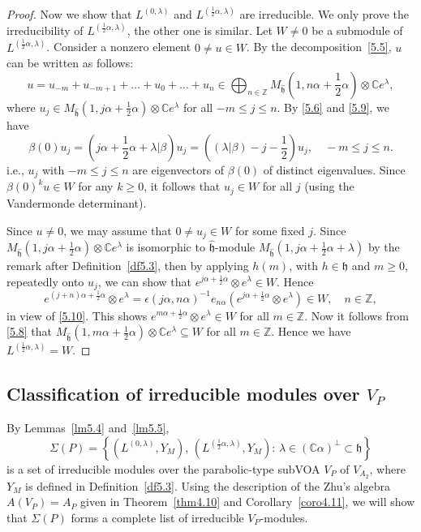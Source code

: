 \documentclass[12pt,a4paper,reqno]{amsart}
\numberwithin{equation}{section}
\numberwithin{equation}{section}
\theoremstyle{definition}
\newcommand{\Z}{\mathbb{Z}}
\def \C {\mathbb{C}}
\def\la{\lambda}
\def \al{\alpha}
\def \b {\beta}
\def \ssq{\subseteq}
\def \h {\mathfrak{h}}
\def\ds{\dots}
\def\o{\otimes}
\begin{document}
\begin{proof}
		Now we show that $L^{(0,\la)}$ and $L^{(\frac{1}{2}\al,\la)}$ are irreducible. We only prove the irreducibility of $L^{(\frac{1}{2}\al,\la)}$, the other one is similar. Let $W\neq 0$ be a submodule of $L^{(\frac{1}{2}\al,\la)}$. Consider a nonzero element $0\neq u\in W$. By the decomposition~\ref{5.5}, $u$ can be written as follows:
		$$u=u_{-m}+u_{-m+1}+\ds+u_0+\ds +u_n\in \bigoplus_{n\in \Z} M_{\hat{\h}}(1,n\al+\frac{1}{2}\al)\o \C e^\la,$$
		where $u_j\in M_{\hat{\h}}(1,j\al+\frac{1}{2}\al)\o \C e^\la$ for all $-m\leq j\leq n$. By \eqref{5.6} and \eqref{5.9}, we have
		$$\b(0)u_j=\left(j\al+\frac{1}{2}\al+\la|\b\right)u_j=\left((\la|\b)-j-\frac{1}{2}\right)u_j,\quad -m\leq j\leq n.$$
		i.e., $u_j$ with $-m\leq j\leq n$ are eigenvectors of $\b(0)$ of distinct eigenvalues. Since $\b(0)^ku\in W$ for any $k\geq 0$, it follows that $u_j\in W$ for all $j$ (using the Vandermonde determinant). 
		
		Since $u\neq 0$, we may assume that $0\neq u_j\in W$ for some fixed $j$. Since  $M_{\hat{\h}}(1,j\al+\frac{1}{2}\al)\o\C e^\la $ is isomorphic to $\hat{\h}$-module $M_{\hat{\h}}(1,j\al+\frac{1}{2}\al+\la)$ by the remark after Definition~\ref{df5.3}, then by applying $h(m)$, with $h\in \h$ and $m\geq 0$, repeatedly onto $u_j$, we can show that $e^{j\al+\frac{1}{2}\al}\o e^\la\in W$. Hence
		$$e^{(j+n)\al+\frac{1}{2}\al}\o e^\la=\epsilon(j\al,n\al)^{-1} e_{n\al} \left(e^{j\al+\frac{1}{2}\al}\o e^\la\right)\in W,\quad n\in \Z,$$
		in view of \eqref{5.10}. This shows $e^{m\al+\frac{1}{2}\al}\o e^\la\in W$ for all $m\in \Z$. Now it follows from \eqref{5.8} that $M_{\hat{\h}}(1,m\al+\frac{1}{2}\al)\o \C e^\la\ssq W$ for all $m\in \Z$. Hence we have  $L^{(\frac{1}{2}\al,\la)} = W$. 
	\end{proof}
	
	
	\subsection{Classification of irreducible modules over $V_P$}\label{Sec:9.2}
	By Lemmas~\ref{lm5.4} and~\ref{lm5.5},
	\begin{equation}\label{5.19}
		\Sigma(P)
		=\left\{ (L^{(0,\la)},Y_M),\, (L^{(\frac{1}{2}\al,\la)},Y_M)
		:\, \la\in (\C\al)^\perp\subset \h \right\}
	\end{equation}
	is a set of irreducible modules over the parabolic-type subVOA $V_P$ of $V_{A_2}$, where $Y_M$ is defined in Definition~\ref{df5.3}.  
	Using the description of the Zhu’s algebra $A(V_P)=A_P$ given in Theorem~\ref{thm4.10} and Corollary~\ref{coro4.11}, we will show that $\Sigma(P)$ forms a complete list of irreducible $V_P$-modules. 
	
\end{document}
